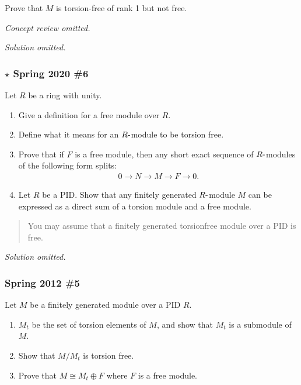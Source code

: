 Prove that \(M\) is torsion-free of rank 1 but not free.

\emph{Concept review omitted.}

\emph{Solution omitted.}

\hypertarget{star-spring-2020-6}{%
\subsubsection{\texorpdfstring{\(\star\) Spring 2020
\#6}{\textbackslash star Spring 2020 \#6}}\label{star-spring-2020-6}}

Let \(R\) be a ring with unity.

\begin{enumerate}
\def\labelenumi{\alph{enumi}.}
\item
  Give a definition for a free module over \(R\).
\item
  Define what it means for an \(R{\hbox{-}}\)module to be torsion free.
\item
  Prove that if \(F\) is a free module, then any short exact sequence of
  \(R{\hbox{-}}\)modules of the following form splits:
  \begin{align*}
  0 \to N \to M \to F \to 0
  .\end{align*}
\item
  Let \(R\) be a PID. Show that any finitely generated
  \(R{\hbox{-}}\)module \(M\) can be expressed as a direct sum of a
  torsion module and a free module.
\end{enumerate}

\begin{quote}
You may assume that a finitely generated torsionfree module over a PID
is free.
\end{quote}

\emph{Solution omitted.}

\hypertarget{spring-2012-5}{%
\subsubsection{Spring 2012 \#5}\label{spring-2012-5}}

Let \(M\) be a finitely generated module over a PID \(R\).

\begin{enumerate}
\def\labelenumi{\alph{enumi}.}
\item
  \(M_t\) be the set of torsion elements of \(M\), and show that \(M_t\)
  is a submodule of \(M\).
\item
  Show that \(M/M_t\) is torsion free.
\item
  Prove that \(M \cong M_t \oplus F\) where \(F\) is a free module.
\end{enumerate}

